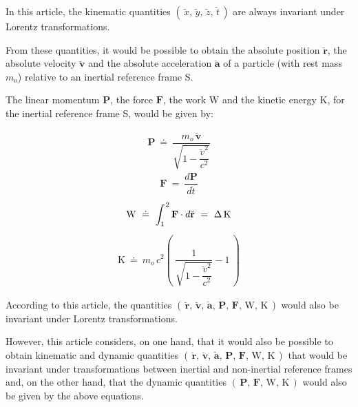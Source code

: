 \documentclass[10pt,fleqn]{article}
\begin{document}
\noindent In this article, the kinematic quantities $( \, \breve{x}, \, \breve{y}, \, \breve{z}, \, \breve{t} \, )$ are always invariant under Lorentz transformations.
\par \bigskip \smallskip
\noindent From these quantities, it would be possible to obtain the absolute position $\breve{\mathbf{r}}$, the absolute velocity $\breve{\mathbf{v}}$ and the absolute acceleration $\breve{\mathbf{a}}$ of a particle (with rest mass $m_o$) relative to an inertial reference frame S.
\par \bigskip \smallskip
\noindent The linear momentum $\mathbf{P}$, the force $\mathbf{F}$, the work $\mathrm{W}$ and the kinetic energy $\mathrm{K}$, for the inertial reference frame S, would be given by:
\par \vspace{+0.30em}
\begin{eqnarray*}
\mathbf{P} ~\doteq~ \dfrac{m_o \, \breve{\mathbf{v}}}{\sqrt{1 - \dfrac{\breve{v}^2}{c^2}}}
\end{eqnarray*}
\vspace{+0.60em}
\begin{eqnarray*}
\mathbf{F} ~=~ \dfrac{d\mathbf{P}}{d\breve{t}}
\end{eqnarray*}
\vspace{+0.30em}
\begin{eqnarray*}
\mathrm{W} ~\doteq~ \int_1^{\hspace{+0.06em}2} \mathbf{F} \cdot d\breve{\mathbf{r}} ~=~ \Delta \, \mathrm{K}
\end{eqnarray*}
\vspace{+0.30em}
\begin{eqnarray*}
\mathrm{K} ~\doteq~ m_o \, c^2 \left ( \: \dfrac{1}{\sqrt{1 - \dfrac{\breve{v}^2}{c^2}}} - 1 \: \right )
\end{eqnarray*}
\par \vspace{+1.50em}
\noindent According to this article, the quantities $( \, \breve{\mathbf{r}}, \, \breve{\mathbf{v}}, \, \breve{\mathbf{a}}, \, \mathbf{P}, \, \mathbf{F}, \, \mathrm{W}, \, \mathrm{K} \, )$ would also be invariant under Lorentz transformations.
\par \bigskip \smallskip
\noindent However, this article considers, on one hand, that it would also be possible to obtain kinematic and dynamic quantities $( \, \breve{\mathbf{r}}, \, \breve{\mathbf{v}}, \, \breve{\mathbf{a}}, \, \mathbf{P}, \, \mathbf{F}, \, \mathrm{W}, \, \mathrm{K} \, )$ that would be invariant under transformations between inertial and non-inertial reference frames and, on the other hand, that the dynamic quantities $( \, \mathbf{P}, \, \mathbf{F}, \, \mathrm{W}, \, \mathrm{K} \, )$ would also be given by the above equations.
\end{document}
